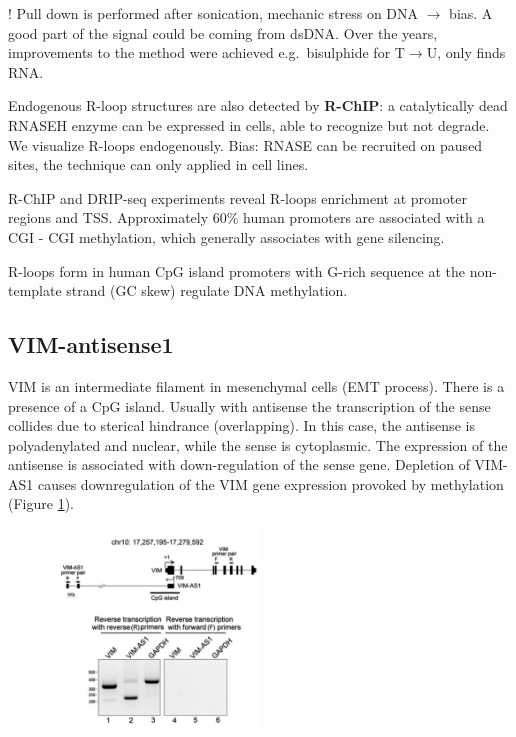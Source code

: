 ! Pull down is performed after sonication, mechanic stress on DNA $\rightarrow$ bias. A good part of the signal could be coming from dsDNA. Over the years, improvements to the method were achieved e.g.~bisulphide for T$\rightarrow$U, only finds RNA.

Endogenous R-loop structures are also detected by \textbf{R-ChIP}: a catalytically dead RNASEH enzyme can be expressed in cells, able to recognize but not degrade. We visualize R-loops endogenously. Bias: RNASE can be recruited on paused sites, the technique can only applied in cell lines.

R-ChIP and DRIP-seq experiments reveal R-loops enrichment at promoter regions and TSS. Approximately 60\% human promoters are associated with a CGI - CGI methylation, which generally associates with gene silencing.

R-loops form in human CpG island promoters with G-rich sequence at the non-template strand (GC skew) regulate DNA methylation.

\hypertarget{vim-antisense1}{%
\subsection{VIM-antisense1}\label{vim-antisense1}}

VIM is an intermediate filament in mesenchymal cells (EMT process). There is a presence of a CpG island. Usually with antisense the transcription of the sense collides due to sterical hindrance (overlapping). In this case, the antisense is polyadenylated and nuclear, while the sense is cytoplasmic. The expression of the antisense is associated with down-regulation of the sense gene. Depletion of VIM-AS1 causes downregulation of the VIM gene expression provoked by methylation (Figure \ref{fig:vim}).

\begin{figure}
\centering
\includegraphics[width=0.5\textwidth]{../_resources/Screen_Shot_2022-11-23_at_10-18-00.png}
\caption{}
\label{fig:vim}
\end{figure}

